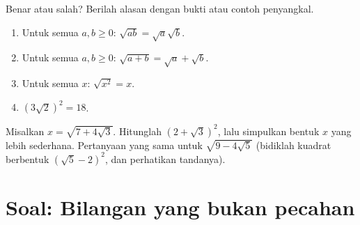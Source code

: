 \begin{exercise}[$\star\star$]\label{exo:g9:sqrt:9}
Benar atau salah? Berilah alasan dengan bukti atau contoh penyangkal.
\begin{enumerate}
  \item Untuk semua $a, b \geq 0$: $\sqrt{ab} = \sqrt a \sqrt b$.
  \item Untuk semua $a, b \geq 0$: $\sqrt{a+b} = \sqrt a + \sqrt b$.
  \item Untuk semua $x$: $\sqrt{x^2} = x$.
  \item $\left(3\sqrt2\right)^2 = 18$.
\end{enumerate}
\end{exercise}

\begin{exercise}[$\star\star\star$]\label{exo:g9:sqrt:10}
Misalkan $x = \sqrt{7 + 4\sqrt3}$. Hitunglah
$\left(2 + \sqrt3\right)^2$, lalu simpulkan bentuk $x$ yang lebih
sederhana. Pertanyaan yang sama untuk $\sqrt{9 - 4\sqrt5}$ (bidiklah
kuadrat berbentuk $\left(\sqrt5 - 2\right)^2$, dan perhatikan
tandanya).
\end{exercise}

\section{Soal: Bilangan yang bukan pecahan}

